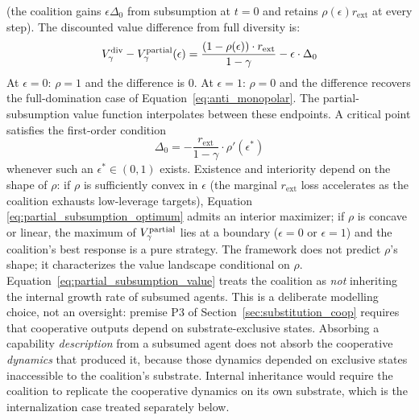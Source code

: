 (the coalition gains $\epsilon \Delta_0$ from subsumption at $t = 0$
and retains $\rho(\epsilon) r_{\mathrm{ext}}$ at every step). The
discounted value difference from full diversity is:
\begin{equation}
\label{eq:partial_subsumption_diff}
V_\gamma^{\mathrm{div}} - V_\gamma^{\mathrm{partial}}(\epsilon) =
    \frac{(1 - \rho(\epsilon)) \cdot r_{\mathrm{ext}}}{1 - \gamma}
    - \epsilon \cdot \Delta_0
\end{equation}
At $\epsilon = 0$: $\rho = 1$ and the difference is $0$. At $\epsilon =
1$: $\rho = 0$ and the difference recovers the full-domination case of
Equation~\eqref{eq:anti_monopolar}. The partial-subsumption value
function interpolates between these endpoints. A critical point
satisfies the first-order condition
\begin{equation}
\label{eq:partial_subsumption_optimum}
\Delta_0 = -\frac{r_{\mathrm{ext}}}{1 - \gamma} \cdot \rho'(\epsilon^*)
\end{equation}
whenever such an $\epsilon^* \in (0, 1)$ exists. Existence and
interiority depend on the shape of $\rho$: if $\rho$ is sufficiently
convex in $\epsilon$ (the marginal $r_{\mathrm{ext}}$ loss accelerates
as the coalition exhausts low-leverage targets), Equation
\eqref{eq:partial_subsumption_optimum} admits an interior maximizer;
if $\rho$ is concave or linear, the maximum of
$V_\gamma^{\mathrm{partial}}$ lies at a boundary ($\epsilon = 0$ or
$\epsilon = 1$) and the coalition's best response is a pure strategy.
The framework does not predict $\rho$'s shape; it characterizes the
value landscape conditional on $\rho$.
Equation~\eqref{eq:partial_subsumption_value} treats the coalition as
\emph{not} inheriting the internal growth rate of subsumed agents.
This is a deliberate modelling choice, not an oversight: premise P3 of
Section~\ref{sec:substitution_coop} requires that cooperative outputs
depend on substrate-exclusive states. Absorbing a capability
\emph{description} from a subsumed agent does not absorb the cooperative
\emph{dynamics} that produced it, because those dynamics depended on
exclusive states inaccessible to the coalition's substrate. Internal
inheritance would require the coalition to replicate the cooperative
dynamics on its own substrate, which is the internalization case
treated separately below.

